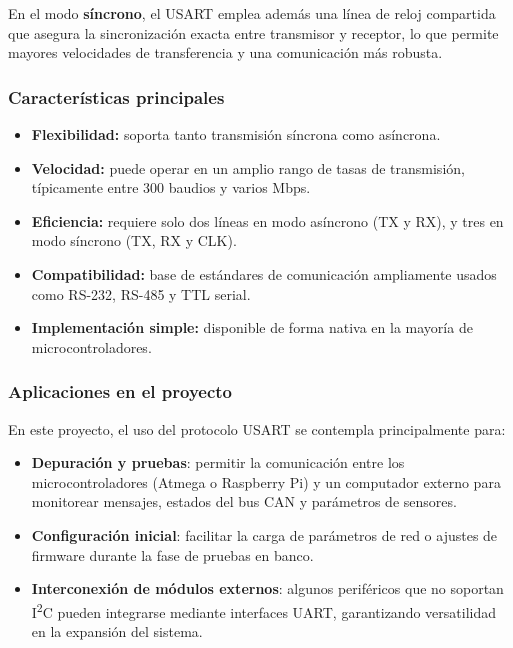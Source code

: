 En el modo \textbf{síncrono}, el USART emplea además una línea de reloj compartida que asegura la sincronización exacta entre transmisor y receptor, lo que permite mayores velocidades de transferencia y una comunicación más robusta.

\subsubsection*{Características principales}

\begin{itemize}
    \item \textbf{Flexibilidad:} soporta tanto transmisión síncrona como asíncrona.
    \item \textbf{Velocidad:} puede operar en un amplio rango de tasas de transmisión, típicamente entre 300 baudios y varios Mbps.
    \item \textbf{Eficiencia:} requiere solo dos líneas en modo asíncrono (TX y RX), y tres en modo síncrono (TX, RX y CLK).
    \item \textbf{Compatibilidad:} base de estándares de comunicación ampliamente usados como RS-232, RS-485 y TTL serial.
    \item \textbf{Implementación simple:} disponible de forma nativa en la mayoría de microcontroladores.
\end{itemize}

\subsubsection*{Aplicaciones en el proyecto}

En este proyecto, el uso del protocolo USART se contempla principalmente para:
\begin{itemize}
    \item \textbf{Depuración y pruebas}: permitir la comunicación entre los microcontroladores (Atmega o Raspberry Pi) y un computador externo para monitorear mensajes, estados del bus CAN y parámetros de sensores.
    \item \textbf{Configuración inicial}: facilitar la carga de parámetros de red o ajustes de firmware durante la fase de pruebas en banco.
    \item \textbf{Interconexión de módulos externos}: algunos periféricos que no soportan I\textsuperscript{2}C pueden integrarse mediante interfaces UART, garantizando versatilidad en la expansión del sistema.
\end{itemize}


